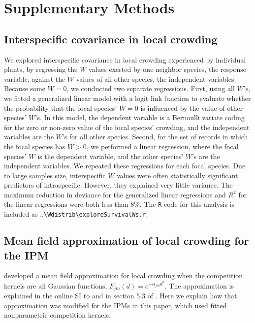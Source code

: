 \documentclass[11pt]{article}
\begin{document}
\vspace{0.4in} 

\section{Supplementary Methods} \label{suppMethods}

\subsection{Interspecific covariance in local crowding} 
We explored interspecific covariance in local crowding experienced by individual plants, by regressing the $W$ values exerted by one neighbor species, the response variable, against the $W$ values of all other species, the independent variables. Because some $W=0$, we conducted two separate regressions. First, using all $W$'s, we fitted a generalized linear model with a logit link function to evaluate whether the probability that the focal species' $W=0$ is influenced by the value of other species' $W$'s. In this model, the dependent variable is a Bernoulli variate coding for the zero or non-zero value of the focal species' crowding, and the independent variables are the $W$'s for all other species. Second, for the set of records in which the focal species has $W>0$, we performed a linear regression, where the focal species' $W$ is the dependent variable, and the other species' $W$'s are the independent variables. We repeated these regressions for each focal species. Due to large samples size, interspecific $W$ values were often statistically significant predictors of intraspecific. However, they explained very little variance. The maximum reduction in deviance for the generalized linear regressions and $R^2$ for the linear regressions were both less than 8\%. The \texttt{R} code for this analysis is included as ..\texttt{\textbackslash Wdistrib\textbackslash exploreSurvivalWs.r}.

\subsection{Mean field approximation of local crowding for the IPM} 
\citet{adler_coexistence_2010} developed a mean field approximation for local crowding when the
competition kernels are all Gaussian functions, $F_{jm}(d) = e^{-\alpha_{jm} d^2}$. The approximation is explained in 
the online SI to \citet{adler_coexistence_2010} and in section 5.3 of \citet{Ellner2016}. 
Here we explain how that approximation was modified for the IPMs in this paper, which
used fitted nonparametric competition kernels. 
\end{document}
